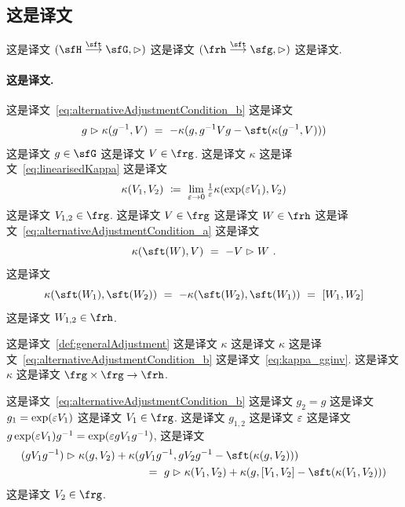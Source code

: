 \documentclass[
    affil-it, %
    auth-lg, %
    british, %
    compression, %
    contents, %
    custom-packages={}, %
    references={bigone}, %
]{lib/preprint}
\begin{document}
\begin{body}
        \subsection{这是译文}\label{app:kappaProperties}

这是译文 $(\sfH\overset{\sft}{\longrightarrow}\sfG,\acton)$ 这是译文 $(\frh\overset{\sft}{\longrightarrow}\sfg,\acton)$ 这是译文. 
        
        \paragraph{这是译文.}
 这是译文~\eqref{eq:alternativeAdjustmentCondition_b} 这是译文         \begin{equation}\label{eq:kappa_gginv}
        	g\acton\kappa(g^{-1},V)\ =\ -\kappa(g,g^{-1}Vg-\sft(\kappa(g^{-1},V)))
        \end{equation}  这是译文 $g\in\sfG$ 这是译文 $V\in\frg$. 这是译文 $\kappa$ 这是译文~\eqref{eq:linearisedKappa} 这是译文         \begin{equation}
        	\kappa(V_1,V_2)\ \coloneqq\ \lim_{\eps\to0}\tfrac1\eps\kappa(\exp(\eps V_1),V_2)
        \end{equation}  这是译文 $V_{1,2}\in\frg$. 这是译文 $V\in\frg$ 这是译文 $W\in\frh$ 这是译文~\eqref{eq:alternativeAdjustmentCondition_a} 这是译文 
        \begin{equation}\label{eq:kappat_linear}
        	\kappa(\sft(W),V)\ =\ -V\acton W~.
        \end{equation}  这是译文         \begin{equation}\label{eq:kappa_tt}
        	\kappa(\sft(W_1),\sft(W_2))\ =\ -\kappa(\sft(W_2),\sft(W_1))\ =\ [W_1,W_2]
        \end{equation}  这是译文 $W_{1,2}\in\frh$.
        
这是译文~\cref{def:generalAdjustment} 这是译文 $\kappa$ 这是译文 $\kappa$ 这是译文~\eqref{eq:alternativeAdjustmentCondition_b} 这是译文~\eqref{eq:kappa_gginv}. 这是译文 $\kappa$ 这是译文 $\frg\times\frg\rightarrow\frh$.
        
这是译文~\eqref{eq:alternativeAdjustmentCondition_b} 这是译文 $g_2=g$ 这是译文 $g_1=\exp(\varepsilon V_1)$ 这是译文 $V_1\in\frg$. 这是译文 $g_{1,2}$ 这是译文 $\varepsilon$ 这是译文 $g\exp(\varepsilon V_1)g^{-1}=\exp(\varepsilon gV_1g^{-1})$, 这是译文 
        \begin{equation}\label{eq:kappa_galfaX}
        	\begin{aligned}
        	   &(gV_1g^{-1})\acton\kappa(g,V_2)+\kappa(gV_1g^{-1},gV_2g^{-1}-\sft(\kappa(g,V_2)))
        	   \\ 
        	   &\kern4cm=\ g\acton\kappa(V_1,V_2)+\kappa(g,[V_1,V_2]-\sft(\kappa(V_1,V_2)))
        	\end{aligned}
        \end{equation}  这是译文 $V_2\in\frg$.
        

\end{body}
\end{document}
